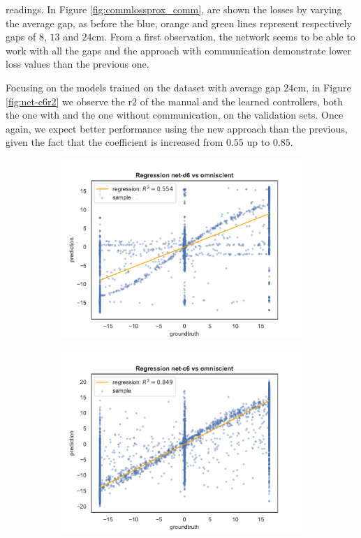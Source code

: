\noindent
 readings. In Figure \ref{fig:commlossprox_comm}, are 
shown the losses by varying the average gap, as before the blue, orange and 
green lines represent respectively gaps of $8$, $13$ and $24$\gls{cm}. From a 
first observation, the network seems to be able to work with all the gaps and the  
approach with communication demonstrate lower loss values than the previous 
one.

Focusing on the models trained on the dataset with average gap $24$\gls{cm}, in 
Figure \ref{fig:net-c6r2} we observe the \gls{r2} of the manual 
and the learned controllers, both the one with and the one without 
communication, on the validation sets.
Once again, we expect better performance using the new approach than the 
previous, given the fact that the coefficient is increased from $0.55$ up to $0.85$.
\begin{figure}[!htb]
	\begin{center}
		\begin{subfigure}[h]{0.49\textwidth}
			\includegraphics[width=\textwidth]{contents/images/net-d6/regression-net-d6-vs-omniscient}%
		\end{subfigure}
		\hfill\vspace{-0.5cm}
		\begin{subfigure}[h]{0.49\textwidth}
			\includegraphics[width=\textwidth]{contents/images/net-c6/regression-net-c6-vs-omniscient}%

\end{subfigure}
\end{center}
\end{figure}
